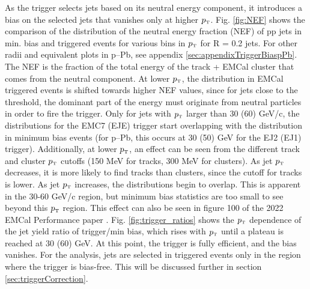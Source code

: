 \documentclass[ALICE]{ALICE_analysis_notes}
\newcommand{\pT}{$p_{\mbox{\tiny T}}$\xspace}
\newcommand{\pPb}{{\mbox{p--Pb}}\xspace}
\newcommand{\pp}{pp\xspace}
\begin{document}
As the trigger selects jets based on its neutral energy component, it introduces a bias on the selected jets that vanishes only at higher \pT. Fig. \ref{fig:NEF} shows the comparison of the distribution of the neutral energy fraction (NEF) of \pp jets in min. bias and triggered events for various bins in \pT for R = 0.2 jets. For other radii and equivalent plots in \pPb, see appendix \ref{sec:appendixTriggerBiaspPb}. The NEF is the fraction of the total energy of the track + EMCal cluster that comes from the neutral component. At lower \pT, the distribution in EMCal triggered events is shifted towards higher NEF values, since for jets close to the threshold, the dominant part of the energy must originate from neutral particles in order to fire the trigger. Only for jets with \pT larger than 30 (60) GeV/c, the distributions for the EMC7 (EJE) trigger start overlapping with the distribution in minimum bias events (for \pPb, this occurs at 30 (50) GeV for the EJ2 (EJ1) trigger). Additionally, at lower \pT, an effect can be seen from the different track and cluster \pT cutoffs (150 MeV for tracks, 300 MeV for clusters). As jet \pT decreases, it is more likely to find tracks than clusters, since the cutoff for tracks is lower. As jet \pT increases, the distributions begin to overlap. This is apparent in the 30-60 GeV/c region, but minimum bias statistics are too small to see beyond this \pT region. This effect can also be seen in figure 100 of the 2022 EMCal Performance paper \cite{EMCalPerformance}. Fig. \ref{fig:trigger_ratios} shows the \pT dependence of the jet yield ratio of trigger/min bias, which rises with \pT until a plateau is reached at 30 (60) GeV. At this point, the trigger is fully efficient, and the bias vanishes. For the analysis, jets are selected in triggered events only in the region where the trigger is bias-free. This will be discussed further in section \ref{sec:triggerCorrection}.
\end{document}
